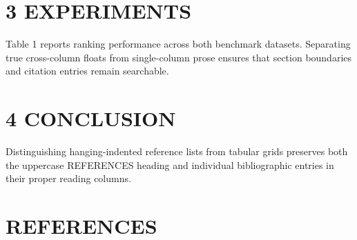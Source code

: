 \documentclass[10pt,twocolumn]{article}
\begin{document}
\section*{3 EXPERIMENTS}
Table 1 reports ranking performance across both benchmark datasets. Separating true cross-column floats from single-column prose ensures that section boundaries and citation entries remain searchable.

\section*{4 CONCLUSION}
Distinguishing hanging-indented reference lists from tabular grids preserves both the uppercase REFERENCES heading and individual bibliographic entries in their proper reading columns.

\clearpage
\section*{REFERENCES}
\end{document}
